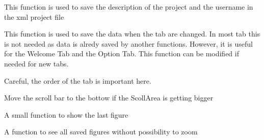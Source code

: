 \documentclass[letterpaper,10pt,english]{sphinxmanual}
\begin{document}
\begin{fulllineitems}

\begin{fulllineitems}
\label{\detokenize{index:src_GUI.Main_windows_1.CentralW.save_info_projet}}
This function is used to save the description of the project and the username in the xml project file

\end{fulllineitems}


\begin{fulllineitems}
\label{\detokenize{index:src_GUI.Main_windows_1.CentralW.save_on_change_tab}}
This function is used to save the data when the tab are changed. In most tab this is not needed as data
is alredy saved by another functions. However, it is useful for the Welcome Tab and the Option Tab.
This function can be modified if needed for new tabs.

Careful, the order of the tab is important here.

\end{fulllineitems}


\begin{fulllineitems}
\label{\detokenize{index:src_GUI.Main_windows_1.CentralW.scrolldown}}
Move the scroll bar to the bottow if the ScollArea is getting bigger

\end{fulllineitems}


\begin{fulllineitems}
\label{\detokenize{index:src_GUI.Main_windows_1.CentralW.showfig}}
A small function to show the last figure

\end{fulllineitems}


\begin{fulllineitems}
\label{\detokenize{index:src_GUI.Main_windows_1.CentralW.showfig2}}
A function to see all saved figures without possibility to zoom


\end{fulllineitems}
\end{fulllineitems}
\end{document}
